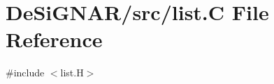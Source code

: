 \hypertarget{list_8_c}{}\section{De\+Si\+G\+N\+A\+R/src/list.C File Reference}
\label{list_8_c}
{\ttfamily \#include $<$list.\+H$>$}\newline
